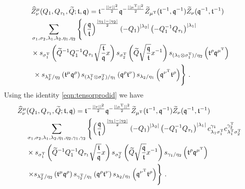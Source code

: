 \documentclass[main.tex]{subfiles}
\begin{document}
\begin{equation}
\begin{aligned}
&\widehat{Z}^{\mu}_{\nu}(Q_1,Q_{\tau_1},\widetilde{Q};\tbf,\qbf)=\tbf^{-\frac{||\nu||^2}{2}}\qbf^{-\frac{||\mu^{\trans}||^2}{2}}\widetilde{Z}_{\mu^{\trans}}(\tbf^{-1},\qbf^{-1})\widetilde{Z}_{\nu}(\qbf^{-1},\tbf^{-1})\\
&\sum_{\sigma_1,\sigma_2,\lambda_1,\lambda_2,\eta_1,\eta_2}\left\{\left(\frac{\qbf}{\tbf}\right)^{\frac{|\eta_1|-|\eta_2|}{2}}\left(-Q_1\right)^{|\lambda_2|}\left(-Q_1^{-1}Q_{\tau_1}\right)^{|\lambda_1|}\right.\\
&\times s_{\sigma_1^{\trans}}\left(\widetilde{Q}^{-1}Q_1^{-1}Q_{\tau_1}\sqrt{\frac{\tbf}{\qbf}}x\right) s_{\sigma^{\trans}_2}\left(\widetilde{Q}\sqrt{\frac{\qbf}{\tbf}}x^{-1}\right)s_{(\lambda_1\otimes\sigma_1^{\trans})/\eta_2}\left(\tbf^{\rho}\qbf^{\mu^{\trans}}\right)\\
&\left.\vphantom{\left(\frac{\qbf}{\tbf}\right)^{\frac{|\eta_1|-|\eta_2|}{2}}}\times s_{\lambda_2^{\trans}/\eta_2}\left(\tbf^{\mu}\qbf^{\rho}\right)s_{(\lambda_1^{\trans}\otimes\sigma_2^{\trans})/\eta_1}\left(\qbf^{\rho}\tbf^{\nu}\right)s_{\lambda_2/\eta_1}\left(\qbf^{\nu^{\trans}}\tbf^{\rho}\right)\right\}\,.
\end{aligned}
\end{equation}
Using the identity \eqref{eqn:tensorprodid} we have
\begin{equation}
\begin{aligned}
\widehat{Z}^{\mu}_{\nu}&(Q_1,Q_{\tau_1},\widetilde{Q};\tbf,\qbf)=\tbf^{-\frac{||\nu||^2}{2}}\qbf^{-\frac{||\mu^{\trans}||^2}{2}}\widetilde{Z}_{\mu^{\trans}}(\tbf^{-1},\qbf^{-1})\widetilde{Z}_{\nu}(\qbf^{-1},\tbf^{-1})\\
&\sum_{\sigma_1,\sigma_2,\lambda_1,\lambda_2,\eta_1,\eta_2,\gamma_1,\gamma_2}\left\{\left(\frac{\qbf}{\tbf}\right)^{\frac{|\eta_1|-|\eta_2|}{2}}\left(-Q_1\right)^{|\lambda_2|}\left(-Q_1^{-1}Q_{\tau_1}\right)^{|\lambda_1|}c_{\lambda_1\sigma_1^{\trans}}^{\gamma_1}c_{\lambda_1^{\trans}\sigma_2^{\trans}}^{\gamma_2^{\trans}}\right.\\
&\times s_{\sigma_1^{\trans}}\left(\widetilde{Q}^{-1}Q_1^{-1}Q_{\tau_1}\sqrt{\frac{\tbf}{\qbf}}x\right)s_{\sigma^{\trans}_2}\left(\widetilde{Q}\sqrt{\frac{\qbf}{\tbf}}x^{-1}\right)s_{\gamma_1/\eta_2}\left(\tbf^{\rho}\qbf^{\mu^{\trans}}\right)\\
&\left.\times \vphantom{\left(\frac{\qbf}{\tbf}\right)^{\frac{|\eta_1|-|\eta_2|}{2}}}s_{\lambda_2^{\trans}/\eta_2}\left(\tbf^{\mu}\qbf^{\rho}\right)s_{\gamma_2^{\trans}/\eta_1}\left(\qbf^{\rho}\tbf^{\nu}\right)s_{\lambda_2/\eta_1}\left(\qbf^{\nu^{\trans}}\tbf^{\rho}\right)\right\}\,.
\end{aligned}
\end{equation}
\end{document}
